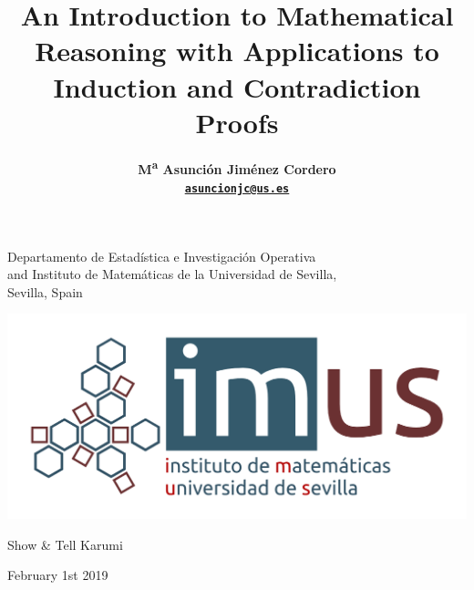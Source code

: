 \documentclass[11pt,a4paper,xcolor=dvipsnames, leqno]{beamer}
\title[Introduction to Mathematical
Reasoning. Induction \& Contradiction Proofs]{An Introduction to Mathematical
Reasoning with Applications to
Induction and Contradiction Proofs}
\author[M\textsuperscript{a} Asunci\'on Jim\'enez Cordero]
{{{\bf M\textsuperscript{a} Asunci\'on Jim\'enez Cordero\\
{\href{mailto:asuncionjc@us.es}{\tt asuncionjc@us.es}}}}}
\institute{Show & Tell Karumi} %
\date{}
\begin{document}
\begingroup 
    \begin{frame}
        \titlepage
\begin{center}
\insertauthor\par
\end{center}
\begin{center}
        \scriptsize Departamento de Estad\'istica e Investigaci\'on Operativa\\ and Instituto de Matem\'aticas de la Universidad de Sevilla,\\
        Sevilla, Spain
        \end{center}
        
\vspace*{0.3cm}
\begin{center}
\includegraphics[scale=0.35]{imus_basico_oct.png}
\end{center}
\begin{center}
\footnotesize{Show \& Tell Karumi}
\end{center}
\begin{center}
\footnotesize{February 1st 2019}
\end{center}
\end{frame}
\endgroup
\end{document}
